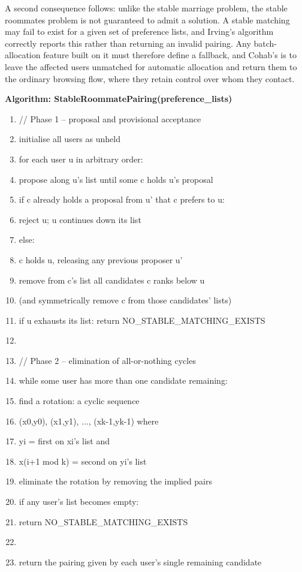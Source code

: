 \documentclass[12pt,a4paper]{report}
\begin{document}
A second consequence follows: unlike the stable marriage problem, the stable roommates problem is not guaranteed to admit a solution. A stable matching may fail to exist for a given set of preference lists, and Irving's algorithm correctly reports this rather than returning an invalid pairing. Any batch-allocation feature built on it must therefore define a fallback, and Cohab's is to leave the affected users unmatched for automatic allocation and return them to the ordinary browsing flow, where they retain control over whom they contact.

\vspace{4mm}

\textbf{Algorithm: StableRoommatePairing(preference\_lists)}

{\begin{enumerate}[label=\arabic*., itemsep=0pt]
    \ttfamily
    \item // Phase 1 -- proposal and provisional acceptance
    \item initialise all users as unheld
    \item for each user u in arbitrary order:
    \item \quad propose along u's list until some c holds u's proposal
    \item \quad if c already holds a proposal from u' that c prefers to u:
    \item \quad\quad reject u; u continues down its list
    \item \quad else:
    \item \quad\quad c holds u, releasing any previous proposer u'
    \item \quad\quad remove from c's list all candidates c ranks below u
    \item \quad\quad (and symmetrically remove c from those candidates' lists)
    \item \quad if u exhausts its list: return NO\_STABLE\_MATCHING\_EXISTS
    \item
    \item // Phase 2 -- elimination of all-or-nothing cycles
    \item while some user has more than one candidate remaining:
    \item \quad find a rotation: a cyclic sequence
    \item \quad\quad (x0,y0), (x1,y1), ..., (xk-1,yk-1) where
    \item \quad\quad yi = first on xi's list and
    \item \quad\quad x(i+1 mod k) = second on yi's list
    \item \quad eliminate the rotation by removing the implied pairs
    \item \quad if any user's list becomes empty:
    \item \quad\quad return NO\_STABLE\_MATCHING\_EXISTS
    \item
    \item return the pairing given by each user's single remaining candidate
\end{enumerate}
}
\end{document}
